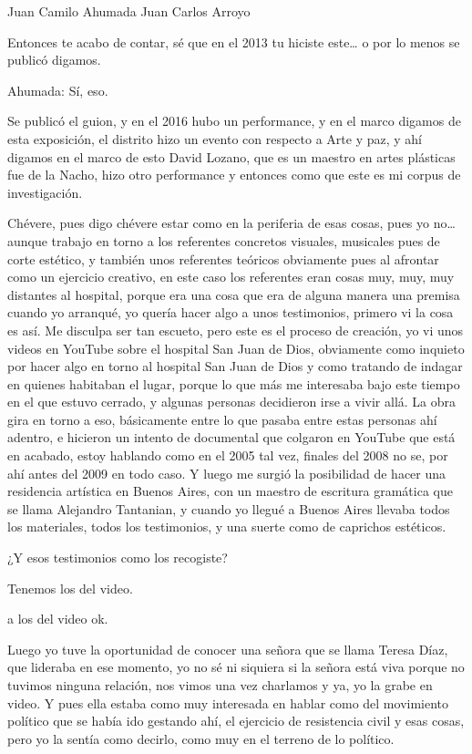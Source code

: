 Juan Camilo Ahumada
Juan Carlos Arroyo

Entonces te acabo de contar, sé que en el 2013 tu hiciste este… o por lo menos se publicó digamos.

Ahumada: Sí, eso.

Se publicó el guion, y en el 2016 hubo un performance, y en el marco digamos de esta exposición, el distrito hizo un evento con respecto a Arte y paz, y ahí digamos en el marco de esto David Lozano, que es un maestro en artes plásticas fue de la Nacho, hizo otro performance y entonces como que este es mi corpus de investigación.

Chévere, pues digo chévere estar como en la periferia de esas cosas, pues yo no… aunque trabajo en torno a los referentes concretos visuales, musicales pues de corte estético, y también unos referentes teóricos obviamente pues al afrontar como un ejercicio creativo, en este caso los referentes eran cosas muy, muy, muy distantes al hospital, porque era una cosa que era de alguna manera una premisa cuando yo arranqué, yo quería hacer algo a unos testimonios, primero vi la cosa es así. Me disculpa ser tan escueto, pero este es el proceso de creación, yo vi unos videos en YouTube sobre el hospital San Juan de Dios, obviamente como inquieto por hacer algo en torno al hospital San Juan de Dios y como tratando de indagar en quienes habitaban el lugar, porque lo que más me interesaba bajo este tiempo en el que estuvo cerrado, y algunas personas decidieron irse a vivir allá. La obra gira en torno a eso, básicamente entre lo que pasaba entre estas personas ahí adentro, e hicieron un intento de documental que colgaron en YouTube que está en acabado, estoy hablando como en el 2005 tal vez, finales del 2008 no se, por ahí antes del 2009 en todo caso.
Y luego me surgió la posibilidad de hacer una residencia artística en Buenos Aires, con un maestro de escritura gramática que se llama Alejandro Tantanian, y cuando yo llegué a Buenos Aires llevaba todos los materiales, todos los testimonios, y una suerte como de caprichos estéticos.

¿Y esos testimonios como los recogiste? 

Tenemos los del video.

a los del video ok.

Luego yo tuve la oportunidad de conocer una señora que se llama Teresa Díaz, que lideraba en ese momento, yo no sé ni siquiera si la señora está viva porque no tuvimos ninguna relación, nos vimos una vez charlamos y ya, yo la grabe en video. Y pues ella estaba como muy interesada en hablar como del movimiento político que se había ido gestando ahí, el ejercicio de resistencia civil y esas cosas, pero yo la sentía como decirlo, como muy en el terreno de lo político.

